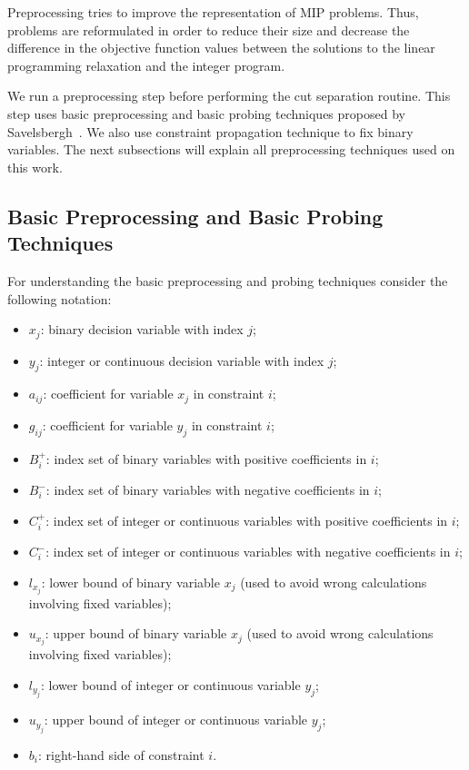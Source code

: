 \documentclass[preprint,12pt]{elsarticle}
\begin{document}
Preprocessing tries to improve the representation of MIP problems. Thus, problems are reformulated in order to reduce their size and decrease the difference in the objective function values between the solutions to the linear programming relaxation and the integer program.

We run a preprocessing step before performing the cut separation routine. This step uses basic preprocessing and basic probing techniques proposed by Savelsbergh~\cite{Savelsbergh1994}. We also use constraint propagation technique to fix binary variables. The next subsections will explain all preprocessing techniques used on this work.

\subsection{Basic Preprocessing and Basic Probing Techniques}

For understanding the basic preprocessing and probing techniques consider the following notation:

\begin{itemize}
\item \textbf{$x_j$}: binary decision variable with index $j$;
\item \textbf{$y_j$}: integer or continuous decision variable with index $j$;
\item \textbf{$a_{ij}$}: coefficient for variable $x_{j}$ in constraint $i$;
\item \textbf{$g_{ij}$}: coefficient for variable $y_{j}$ in constraint $i$;
\item \textbf{$B_i^+$}: index set of binary variables with positive coefficients in $i$;
\item \textbf{$B_i^-$}: index set of binary variables with negative coefficients in $i$;
\item \textbf{$C_i^+$}: index set of integer or continuous variables with positive coefficients in $i$;
\item \textbf{$C_i^-$}: index set of integer or continuous variables with negative coefficients in $i$;
\item \textbf{$l_{x_j}$}: lower bound of binary variable $x_j$ (used to avoid wrong calculations involving fixed variables);
\item \textbf{$u_{x_j}$}: upper bound of binary variable $x_j$ (used to avoid wrong calculations involving fixed variables);
\item \textbf{$l_{y_j}$}: lower bound of integer or continuous variable $y_j$;
\item \textbf{$u_{y_j}$}: upper bound of integer or continuous variable $y_j$;
\item \textbf{$b_i$}: right-hand side of constraint $i$.

\end{itemize}
\end{document}
